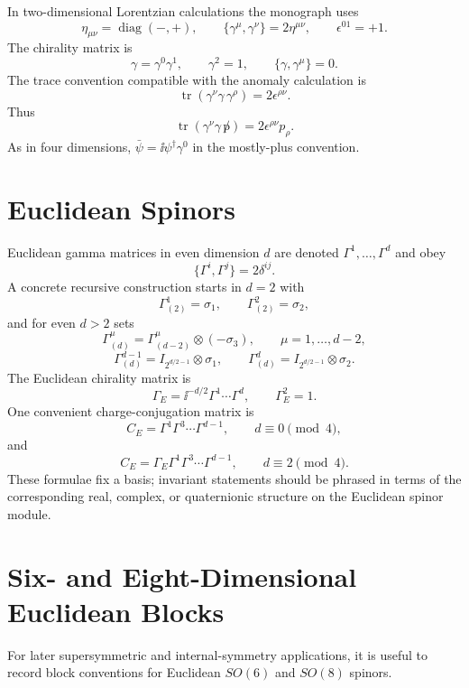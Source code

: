In two-dimensional Lorentzian calculations the monograph uses
\[
  \eta_{\mu\nu}=\operatorname{diag}(-,+),
  \qquad
  \{\gamma^\mu,\gamma^\nu\}=2\eta^{\mu\nu},
  \qquad
  \epsilon^{01}=+1 .
\]
The chirality matrix is
\[
  \gamma=\gamma^0\gamma^1,
  \qquad
  \gamma^2=1,
  \qquad
  \{\gamma,\gamma^\mu\}=0 .
\]
The trace convention compatible with the anomaly calculation is
\[
  \operatorname{tr}(\gamma^\nu\gamma\,\gamma^\rho)
  =
  2\epsilon^{\rho\nu}.
\]
Thus
\[
  \operatorname{tr}(\gamma^\nu\gamma\,\not p)
  =
  2\epsilon^{\rho\nu}p_\rho .
 \]
As in four dimensions, \(\bar\psi=\ii\psi^\dagger\gamma^0\) in the
mostly-plus convention.

\section{Euclidean Spinors}

Euclidean gamma matrices in even dimension \(d\) are denoted
\(\Gamma^1,\ldots,\Gamma^d\) and obey
\[
  \{\Gamma^i,\Gamma^j\}=2\delta^{ij}.
\]
A concrete recursive construction starts in \(d=2\) with
\[
  \Gamma^1_{(2)}=\sigma_1,
  \qquad
  \Gamma^2_{(2)}=\sigma_2,
\]
and for even \(d>2\) sets
\[
  \Gamma^\mu_{(d)}
  =
  \Gamma^\mu_{(d-2)}\otimes(-\sigma_3),
  \qquad
  \mu=1,\ldots,d-2,
\]
\[
  \Gamma^{d-1}_{(d)}
  =
  I_{2^{d/2-1}}\otimes\sigma_1,
  \qquad
  \Gamma^d_{(d)}
  =
  I_{2^{d/2-1}}\otimes\sigma_2 .
\]
The Euclidean chirality matrix is
\[
  \Gamma_E
  =
  \ii^{-d/2}\Gamma^1\cdots\Gamma^d,
  \qquad
  \Gamma_E^2=1 .
\]
One convenient charge-conjugation matrix is
\[
  C_E=\Gamma^1\Gamma^3\cdots\Gamma^{d-1},
  \qquad d\equiv0\pmod4,
\]
and
\[
  C_E=\Gamma_E\Gamma^1\Gamma^3\cdots\Gamma^{d-1},
  \qquad d\equiv2\pmod4.
\]
These formulae fix a basis; invariant statements should be phrased in terms
of the corresponding real, complex, or quaternionic structure on the
Euclidean spinor module.

\section{Six- and Eight-Dimensional Euclidean Blocks}

For later supersymmetric and internal-symmetry applications, it is useful to
record block conventions for Euclidean \(SO(6)\) and \(SO(8)\) spinors.

